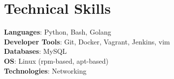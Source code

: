 \documentclass[letterpaper,11pt]{article}
\makeatletter
\newcommand{\resumeItem}[1]{
  \item\small{
    {#1 \vspace{-2pt}}
  }
}
\newcommand{\resumeProjectHeading}[2]{
    \item
    \begin{tabular*}{0.97\textwidth}{l@{\extracolsep{\fill}}r}
      \small#1 & #2 \\
    \end{tabular*}\vspace{-7pt}
}
\newcommand{\resumeSubHeadingListStart}{\begin{itemize}[leftmargin=0.15in, label={}]}
\newcommand{\resumeSubHeadingListEnd}{\end{itemize}}
\newcommand{\resumeItemListStart}{\begin{itemize}}
\newcommand{\resumeItemListEnd}{\end{itemize}\vspace{-5pt}}
\makeatother
\begin{document}

\section{Technical Skills}
 \begin{itemize}[leftmargin=0.15in, label={}]
    \small{\item{
     \textbf{Languages}{: Python, Bash, Golang} \\
     \textbf{Developer Tools}{: Git, Docker, Vagrant, Jenkins, vim} \\
     \textbf{Databases}{: MySQL} \\
     \textbf{OS}{: Linux (rpm-based, apt-based)} \\
     \textbf{Technologies}{: Networking}
    }}
 \end{itemize}

%
\end{document}
